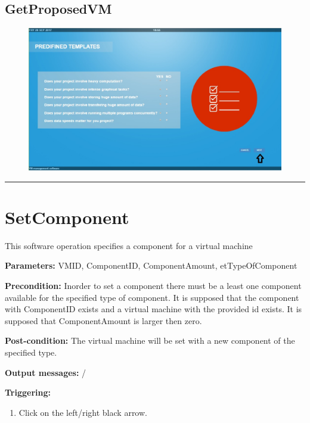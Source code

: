\subsection{GetProposedVM}

\begin{figure}[H]
\centering
\includegraphics[width=170mm]{images/getproposed.eps}
\caption{\label{overflow}}
\end{figure}


\hrule
\vspace{0.5cm}





















\section{SetComponent}
\label{operation:SetComponent}
This software operation specifies a component for a virtual machine
\begin{description}

\item \textbf{Parameters:} VMID, ComponentID, ComponentAmount,
etTypeOfComponent
\item \textbf{Precondition:} Inorder to set a component there must be a least
one component available for the specified type of component. It is supposed that
the component with ComponentID exists and a virtual machine with the provided id
exists. It is supposed that ComponentAmount is larger then zero.
\item \textbf{Post-condition:} The virtual machine will be set with a new
component of the specified type.
\item \textbf{Output messages:} /

\item \textbf{Triggering:}
\begin{enumerate}
\item Click on the left/right black arrow.
\end{enumerate}

 
\end{description}
 
